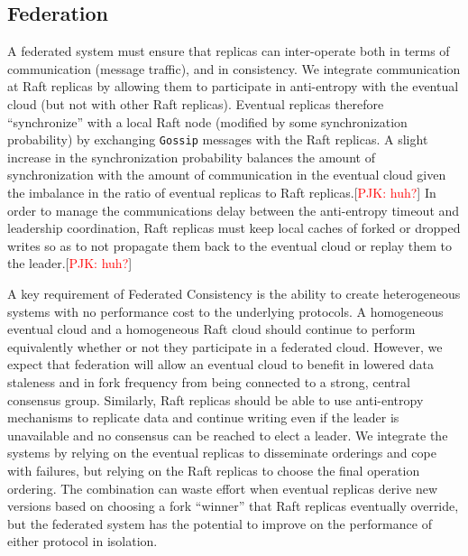 \documentclass[10pt,conference,letterpaper]{IEEEtran}
\newcommand{\todo}[1]{{\textcolor{red}{#1}}}
\newcommand{\pjk}[1]{[\todo{PJK: #1}]}
\newcommand{\note}[1]{\textcolor{blue}{[#1]}}
\begin{document}
\subsection{Federation}


A federated system must ensure that replicas can inter-operate both in terms of
communication (message traffic), and in consistency.
We integrate communication at Raft replicas by allowing them to participate in anti-entropy
with the eventual cloud (but not with other Raft replicas).
Eventual replicas therefore ``synchronize'' with a local Raft node (modified by some
synchronization probability) by exchanging \texttt{Gossip} messages with the Raft replicas.
A slight increase in the synchronization probability balances the amount of
synchronization with the amount of communication in the eventual cloud given the imbalance
in the ratio of eventual replicas to Raft replicas.\pjk{huh?}
In order to manage the communications delay between the anti-entropy timeout and
leadership coordination, Raft replicas must keep local caches of forked or dropped writes so
as to not propagate them back to the eventual cloud or replay them to the leader.\pjk{huh?}

A key requirement of Federated Consistency is the ability to create heterogeneous systems
with no performance cost to the underlying protocols.
A homogeneous eventual cloud and a homogeneous Raft cloud should continue to perform
equivalently whether or not they participate in a federated cloud.
However, we expect that federation will allow an eventual cloud to benefit in lowered data
staleness and in fork frequency from being connected to a strong, central consensus group.
Similarly, Raft replicas should be able to use anti-entropy mechanisms to replicate data
and continue writing even if the leader is unavailable and no consensus can be reached to
elect a leader.
We integrate the systems by relying on the eventual replicas to disseminate orderings and
cope with failures, but relying on the Raft replicas to choose the final operation
ordering.
The combination can waste effort when eventual replicas derive new versions based on
choosing a fork ``winner'' that Raft replicas eventually override, but the federated
system has the potential to improve on the performance of either protocol in isolation.
\end{document}
